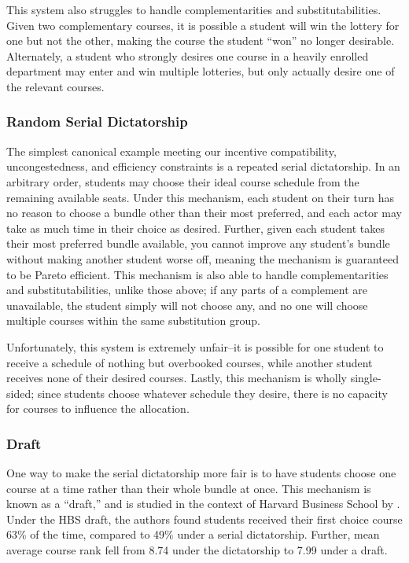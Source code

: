 \documentclass{article}
\begin{document}
This system also struggles to handle complementarities and substitutabilities. Given two complementary courses, it is possible a student will win the lottery for one but not the other, making the course the student ``won'' no longer desirable. Alternately, a student who strongly desires one course in a heavily enrolled department may enter and win multiple lotteries, but only actually desire one of the relevant courses. 

\subsubsection{Random Serial Dictatorship}

The simplest canonical example meeting our incentive compatibility, uncongestedness, and efficiency constraints is a repeated serial dictatorship. In an arbitrary order, students may choose their ideal course schedule from the remaining available seats. Under this mechanism, each student on their turn has no reason to choose a bundle other than their most preferred, and each actor may take as much time in their choice as desired. Further, given each student takes their most preferred bundle available, you cannot improve any student's bundle without making another student worse off, meaning the mechanism is guaranteed to be Pareto efficient. This mechanism is also able to handle complementarities and substitutabilities, unlike those above; if any parts of a complement are unavailable, the student simply will not choose any, and no one will choose multiple courses within the same substitution group.


Unfortunately, this system is extremely unfair--it is possible for one student to receive a schedule of nothing but overbooked courses, while another student receives none of their desired courses. Lastly, this mechanism is wholly single-sided; since students choose whatever schedule they desire, there is no capacity for courses to influence the allocation.

\subsubsection{Draft}

One way to make the serial dictatorship more fair is to have students choose one course at a time rather than their whole bundle at once. This mechanism is known as a ``draft,'' and is studied in the context of Harvard Business School by \textcite{budish2012}. Under the HBS draft, the authors found students received their first choice course 63\% of the time, compared to 49\% under a serial dictatorship. Further, mean average course rank fell from 8.74 under the dictatorship to 7.99 under a draft. 
\end{document}

